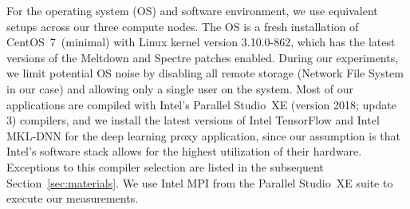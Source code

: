 For the operating system (OS) and software environment, we use equivalent setups across our three compute nodes.
The OS is a fresh installation of CentOS~7~(minimal) with Linux kernel version 3.10.0-862, which has the latest versions of
the Meltdown and Spectre patches enabled. During our experiments, we limit potential OS noise by disabling all
remote storage (Network File System in our case) and allowing only a single user on the system.
Most of our applications are compiled with Intel's Parallel Studio~XE (version 2018; update 3) compilers, and we
install the latest versions of Intel TensorFlow and Intel MKL-DNN for the deep learning proxy application, since
our assumption is that Intel's software stack allows for the highest utilization of their hardware.
Exceptions to this compiler selection are listed in the subsequent Section~\ref{sec:materials}.
We use Intel MPI from the Parallel Studio~XE suite to execute our measurements.


